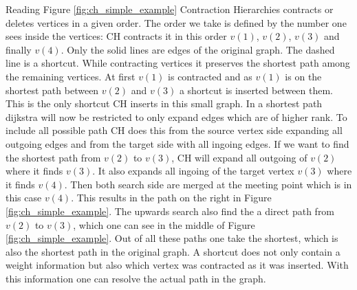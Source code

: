 Reading Figure \ref{fig:ch_simple_example} Contraction Hierarchies contracts or deletes vertices in a given order. 
The order we take is defined by the number one sees inside the vertices: CH contracts it in this order $v(1)$, $v(2)$, $v(3)$ and finally $v(4)$.
Only the solid lines are edges of the original graph.
The dashed line is a shortcut.
While contracting vertices it preserves the shortest path among the remaining vertices.
At first $v(1)$ is contracted and as $v(1)$ is on the shortest path between $v(2)$ and $v(3)$ a shortcut is inserted between them.
This is the only shortcut CH inserts in this small graph.
In a shortest path dijkstra will now be restricted to only expand edges which are of higher rank.
To include all possible path CH does this from the source vertex side expanding all outgoing edges and from the target side with all ingoing edges.
If we want to find the shortest path from $v(2)$ to $v(3)$, CH will expand all outgoing of $v(2)$ where it finds $v(3)$.
It also expands all ingoing of the target vertex $v(3)$ where it finds $v(4)$. 
Then both search side are merged at the meeting point which is in this case $v(4)$.
This results in the path on the right in Figure \ref{fig:ch_simple_example}. 
The upwards search also find the a direct path from $v(2)$ to $v(3)$, which one can see in the middle of Figure \ref{fig:ch_simple_example}. 
Out of all these paths one take the shortest, which is also the shortest path in the original graph.
A shortcut does not only contain a weight information but also which vertex was contracted as it was inserted.
With this information one can resolve the actual path in the graph.